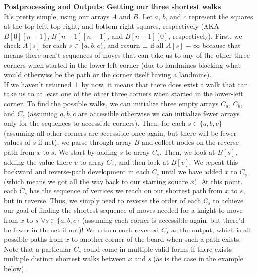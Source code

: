 \documentclass[11pt]{article}
\begin{document}
\begin{enumerate}
\begin{enumerate}
\textbf{Postprocessing and Outputs: Getting our three shortest walks} \\
It's pretty simple, using our arrays $A$ and $B$. Let $a$, $b$, and $c$ represent the squares at the top-left, top-right, and bottom-right squares, respectively (AKA $B[0][n-1]$, $B[n-1][n-1]$, and $B[n-1][0]$, respectively). First, we check $A[s]$ for each $s \in \{a, b, c\}$, and return $\bot$ if all $A[s] = \infty$ because that means there aren't sequences of moves that can take us to any of the other three corners when started in the lower-left corner (due to landmines blocking what would otherwise be the path or the corner itself having a landmine). \\
If we haven't returned $\bot$ by now, it means that there does exist a walk that can take us to at least one of the other three corners when started in the lower-left corner. To find the possible walks, we can initialize three empty arrays $C_a$, $C_b$, and $C_c$ (assuming $a, b, c$ are accessible otherwise we can initialize fewer arrays only for the sequences to accessible corners). Then, for each $s \in \{a, b, c\}$ (assuming all other corners are accessible once again, but there will be fewer values of $s$ if not), we parse through array $B$ and collect nodes on the reverse path from $x$ to $s$. We start by adding $s$ to array $C_s$. Then, we look at $B[s]$, adding the value there $v$ to array $C_s$, and then look at $B[v]$. We repeat this backward and reverse-path development in each $C_s$ until we have added $x$ to $C_s$ (which means we got all the way back to our starting square $x$). At this point, each $C_s$ has the sequence of vertices we reach on our shortest path from $x$ to $s$, but in reverse. Thus, we simply need to reverse the order of each $C_s$ to achieve our goal of finding the shortest sequence of moves needed for a knight to move from $x$ to $s$ $\forall  s \in \{a, b, c\}$ (assuming each corner is accessible again, but there'd be fewer in the set if not)! We return each reversed $C_s$ as the output, which is all possible paths from $x$ to another corner of the board when such a path exists. Note that a particular $C_s$ could come in multiple valid forms if there exists multiple distinct shortest walks between $x$ and $s$ (as is the case in the example below).\\


\end{enumerate}
\end{enumerate}
\end{document}
